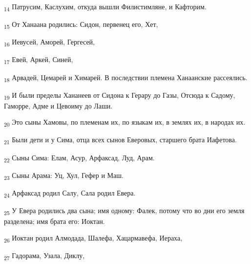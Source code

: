 \begin{tcolorbox}
\textsubscript{14} Патрусим, Каслухим, откуда вышли Филистимляне, и Кафторим.
\end{tcolorbox}
\begin{tcolorbox}
\textsubscript{15} От Ханаана родились: Сидон, первенец его, Хет,
\end{tcolorbox}
\begin{tcolorbox}
\textsubscript{16} Иевусей, Аморей, Гергесей,
\end{tcolorbox}
\begin{tcolorbox}
\textsubscript{17} Евей, Аркей, Синей,
\end{tcolorbox}
\begin{tcolorbox}
\textsubscript{18} Арвадей, Цемарей и Химарей. В последствии племена Ханаанские рассеялись.
\end{tcolorbox}
\begin{tcolorbox}
\textsubscript{19} И были пределы Хананеев от Сидона к Герару до Газы, Отсюда к Садому, Гаморре, Адме и Цевоиму до Лаши.
\end{tcolorbox}
\begin{tcolorbox}
\textsubscript{20} Это сыны Хамовы, по племенам их, по языкам их, в землях их, в народах их.
\end{tcolorbox}
\begin{tcolorbox}
\textsubscript{21} Были дети и у Сима, отца всех сынов Еверовых, старшего брата Иафетова.
\end{tcolorbox}
\begin{tcolorbox}
\textsubscript{22} Сыны Сима: Елам, Асур, Арфаксад, Луд, Арам.
\end{tcolorbox}
\begin{tcolorbox}
\textsubscript{23} Сыны Арама: Уц, Хул, Гефер и Маш.
\end{tcolorbox}
\begin{tcolorbox}
\textsubscript{24} Арфаксад родил Салу, Сала родил Евера.
\end{tcolorbox}
\begin{tcolorbox}
\textsubscript{25} У Евера родились два сына; имя одному: Фалек, потому что во дни его земля разделена; имя брата его: Иоктан.
\end{tcolorbox}
\begin{tcolorbox}
\textsubscript{26} Иоктан родил Алмодада, Шалефа, Хацармавефа, Иераха,
\end{tcolorbox}
\begin{tcolorbox}
\textsubscript{27} Гадорама, Узала, Диклу,
\end{tcolorbox}
